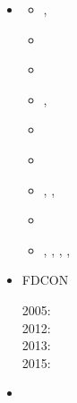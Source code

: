 \begin{itemize}
\item \fantom {}

\begin{scriptsize}
\begin{itemize}
\item[\twothousandeleven]    \textcite{thie11},  \textcite{alht11}
\item[\twothousandtwelve]    \textcite{alht12}
\item[\twothousandthirteen]  \textcite{alhf13}
\item[\twothousandfourteen]  \textcite{erhv14},  \textcite{thsh14}
\item[\twothousandfifteen]   \textcite{erhv15}
\item[\twothousandeighteen]  \textcite{sahf18}
\item[\twothousandnineteen]  \textcite{erhv19},  \textcite{thhu19},  \textcite{wohu19}
\item[\twothousandtwentyone] \textcite{erhf21}
\item[\twothousandtwentytwo] \textcite{thhu22},  \textcite{wohb22},  \textcite{erhf22},
                             \textcite{thhl22},  \textcite{pihg22}
\end{itemize}
\end{scriptsize}

\item FDCON 

\begin{scriptsize}
2005: \textcite{enbs05}\\
2012: \textcite{crsg12}\\
2013: \textcite{fusc13}\\
2015: \textcite{fuks15}
\end{scriptsize}

\item \fluidity {}


\end{itemize}
